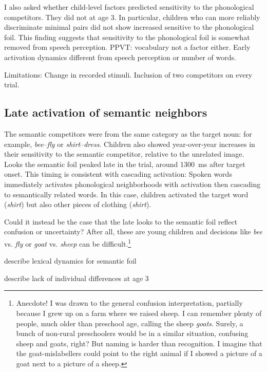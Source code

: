 \documentclass [11pt, proquest] {uwthesis}[2015/03/03]
\begin{document}
I also asked whether child-level factors predicted sensitivity to the
phonological competitors. They did not at age 3. In particular, children
who can more reliably discriminate minimal pairs did not show increased
sensitive to the phonological foil. This finding suggests that
sensitivity to the phonological foil is somewhat removed from speech
perception. PPVT: vocabulary not a factor either. Early activation
dynamics different from speech perception or number of words.

Limitations: Change in recorded stimuli. Inclusion of two competitors on
every trial.

\subsection{Late activation of semantic
neighbors}\label{late-activation-of-semantic-neighbors}

The semantic competitors were from the same category as the target noun:
for example, \emph{bee}--\emph{fly} or \emph{shirt}--\emph{dress}.
Children also showed year-over-year increases in their sensitivity to
the semantic competitor, relative to the unrelated image. Looks the
semantic foil peaked late in the trial, around 1300~ms after target
onset. This timing is consistent with cascading activation: Spoken words
immediately activates phonological neighborhoods with activation then
cascading to semantically related words. In this case, children
activated the target word (\emph{shirt}) but also other pieces of
clothing (\emph{shirt}).

Could it instead be the case that the late looks to the semantic foil
reflect confusion or uncertainty? After all, these are young children
and decisions like \emph{bee} vs. \emph{fly} or \emph{goat} vs.
\emph{sheep} can be difficult.\footnote{Anecdote! I was drawn to the
  general confusion interpretation, partially because I grew up on a
  farm where we raised sheep. I can remember plenty of people, much
  older than preschool age, calling the sheep \emph{goats}. Surely, a
  bunch of non-rural preschoolers would be in a similar situation,
  confusing sheep and goats, right? But naming is harder than
  recognition. I imagine that the goat-mislabellers could point to the
  right animal if I showed a picture of a goat next to a picture of a
  sheep.}

describe lexical dynamics for semantic foil

describe lack of individual differences at age 3
\end{document}
